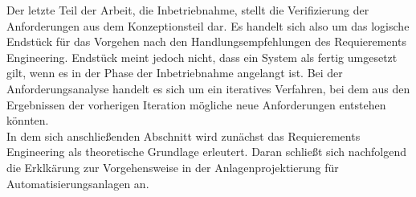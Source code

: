 \documentclass[../../Bachelorarbeit.tex]{subfiles}
\begin{document}
Der letzte Teil der Arbeit, die Inbetriebnahme, stellt die Verifizierung der Anforderungen aus dem Konzeptionsteil dar. Es handelt sich also um das logische Endstück für das Vorgehen nach den Handlungsempfehlungen des Requierements Engineering. Endstück meint jedoch nicht, dass ein System als fertig umgesetzt gilt, wenn es in der Phase der Inbetriebnahme angelangt ist. Bei der Anforderungsanalyse handelt es sich um ein iteratives Verfahren, bei dem aus den Ergebnissen der vorherigen Iteration mögliche neue Anforderungen entstehen könnten.\\ %
In dem sich anschließenden Abschnitt wird zunächst das Requierements Engineering als theoretische Grundlage erleutert. Daran schließt sich nachfolgend die Erklkärung zur Vorgehensweise in der Anlagenprojektierung für Automatisierungsanlagen an. 
\end{document}
